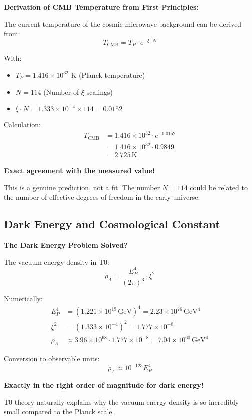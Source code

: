 \documentclass[12pt,a4paper]{article}
\newcommand{\xipar}{\xi}
\begin{document}
	\begin{application}
		\textbf{Derivation of CMB Temperature from First Principles:}
		
		The current temperature of the cosmic microwave background can be derived from:
		\begin{equation}
			T_{\text{CMB}} = T_P \cdot e^{-\xipar \cdot N}
		\end{equation}
		
		With:
		\begin{itemize}
			\item $T_P = 1.416 \times 10^{32}$ K (Planck temperature)
			\item $N = 114$ (Number of $\xi$-scalings)
			\item $\xipar \cdot N = 1.333 \times 10^{-4} \times 114 = 0.0152$
		\end{itemize}
		
		Calculation:
		\begin{align}
			T_{\text{CMB}} &= 1.416 \times 10^{32} \cdot e^{-0.0152} \\
			&= 1.416 \times 10^{32} \cdot 0.9849 \\
			&= 2.725\, \text{K}
		\end{align}
		
		\textbf{Exact agreement with the measured value!}
		
		This is a genuine prediction, not a fit. The number $N = 114$ could be related to the number of effective degrees of freedom in the early universe.
	\end{application}
	
	\subsection{Dark Energy and Cosmological Constant}
	
	\begin{insight}
		\textbf{The Dark Energy Problem Solved?}
		
		The vacuum energy density in T0:
		\begin{equation}
			\rho_{\Lambda} = \frac{E_P^4}{(2\pi)^3} \cdot \xipar^2
		\end{equation}
		
		Numerically:
		\begin{align}
			E_P^4 &= (1.221 \times 10^{19}\, \text{GeV})^4 = 2.23 \times 10^{76}\, \text{GeV}^4 \\
			\xipar^2 &= (1.333 \times 10^{-4})^2 = 1.777 \times 10^{-8} \\
			\rho_{\Lambda} &\approx 3.96 \times 10^{68} \cdot 1.777 \times 10^{-8} = 7.04 \times 10^{60}\, \text{GeV}^4
		\end{align}
		
		Conversion to observable units:
		\begin{equation}
			\rho_{\Lambda} \approx 10^{-123} E_P^4
		\end{equation}
		
		\textbf{Exactly in the right order of magnitude for dark energy!}
		
		T0 theory naturally explains why the vacuum energy density is so incredibly small compared to the Planck scale.
	\end{insight}
	
\end{document}
